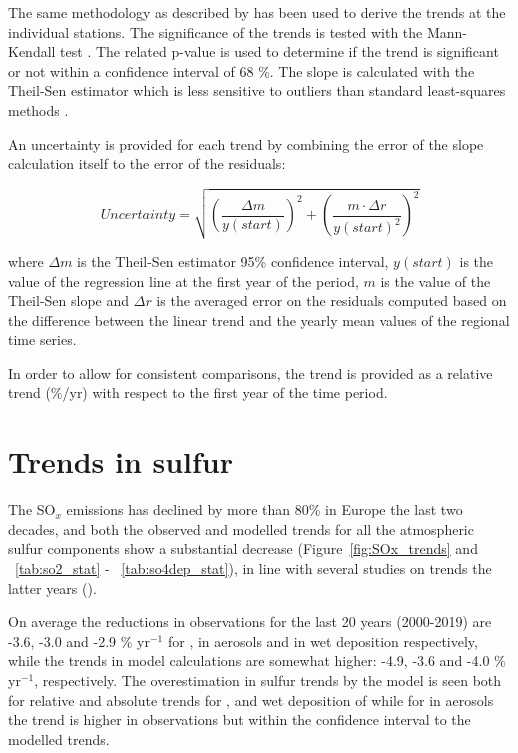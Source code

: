 The same methodology as described by \cite{aas2019global, mortier2020} has been used to derive the trends at the individual stations. The significance of the trends is tested with the Mann-Kendall test \citep{hamed1998modified}. The related p-value is used to determine if the trend is significant or not within a confidence interval of 68 \%. The slope is calculated with the Theil-Sen estimator which is less sensitive to outliers than standard least-squares methods \citep{sen1968estimates}.

An uncertainty is provided for each trend by combining the error of the slope calculation itself to the error of the residuals:

\begin{equation}
 Uncertainty = \sqrt{{\left (\frac{\Delta m}{y(start)}\right )}^{2} + {\left ( \frac{m \cdot \Delta r}{y(start)^2}\right )}^{2} }
\end{equation}

where $\Delta m$ is the Theil-Sen estimator 95\% confidence interval, $y(start)$ is the value of the regression line at the first year of the period, $m$ is the value of the Theil-Sen slope and $\Delta r$ is the averaged error on the residuals computed based on the difference between the linear trend and the yearly mean values of the regional time series.

In order to allow for consistent comparisons, the trend is provided as a relative trend (\%/yr) with respect to the first year of the time period.



\section{\label{sec:Trends_sulfur}Trends in sulfur}

The SO$_x$ emissions has declined by more than 80\% in Europe the last two decades, and both the observed and modelled trends for all the atmospheric sulfur components show a substantial decrease (Figure~\ref{fig:SOx_trends} and ~\ref{tab:so2_stat} - ~\ref{tab:so4dep_stat}), in line with several studies on trends the latter years (\cite{aas2019global, Colette2012, Vivanco2018, Theobald2019, Colette2021, Banzhaf2015, torseth2012, Crippa2016}).

On average the reductions in observations for the last 20 years (2000-2019) are -3.6, -3.0 and -2.9  \% yr$^{-1}$ for \soii, \soiv in aerosols and in wet deposition respectively, while the trends in model calculations are somewhat higher: -4.9, -3.6 and -4.0 \% yr$^{-1}$, respectively. The overestimation in sulfur trends by the model is seen both for relative and absolute trends for \soii, and wet deposition of \soiv while for \soiv in aerosols the trend is higher in observations but within the confidence interval to the modelled trends. 


